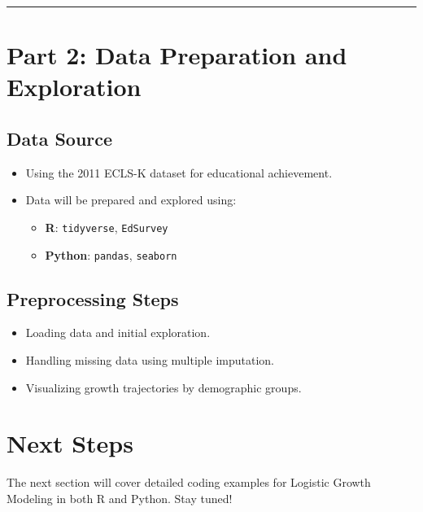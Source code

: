 \documentclass[
  letterpaper,
  DIV=11,
  numbers=noendperiod]{scrreprt}
\providecommand{\tightlist}{%
  \setlength{\itemsep}{0pt}\setlength{\parskip}{0pt}}\usepackage{longtable,booktabs,array}
\begin{document}
\begin{center}\rule{0.5\linewidth}{0.5pt}\end{center}

\section{Part 2: Data Preparation and
Exploration}\label{part-2-data-preparation-and-exploration}

\subsection{Data Source}\label{data-source}

\begin{itemize}
\tightlist
\item
  Using the 2011 ECLS-K dataset for educational achievement.
\item
  Data will be prepared and explored using:

  \begin{itemize}
  \tightlist
  \item
    \textbf{R}: \texttt{tidyverse}, \texttt{EdSurvey}
  \item
    \textbf{Python}: \texttt{pandas}, \texttt{seaborn}
  \end{itemize}
\end{itemize}

\subsection{Preprocessing Steps}\label{preprocessing-steps}

\begin{itemize}
\tightlist
\item
  Loading data and initial exploration.
\item
  Handling missing data using multiple imputation.
\item
  Visualizing growth trajectories by demographic groups.
\end{itemize}

\section{Next Steps}\label{next-steps}

The next section will cover detailed coding examples for Logistic Growth
Modeling in both R and Python. Stay tuned!

\end{document}
